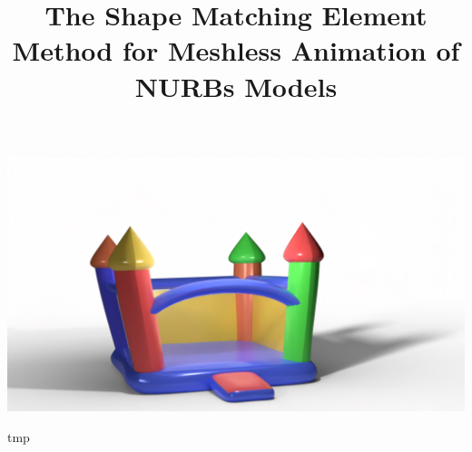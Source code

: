 \documentclass[acmtog, anonymous,review, nonacm, balance = false]{acmart}
\begin{document}
\title{The Shape Matching Element Method for Meshless Animation of NURBs Models}

\begin{teaserfigure}
  \includegraphics[width=\textwidth]{castle.png}
  \caption{tmp}
  \Description{}
  \label{fig:teaser}
\end{teaserfigure}

\maketitle










\end{document}
